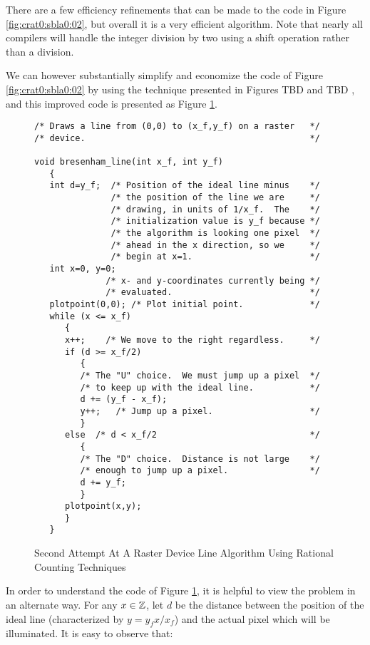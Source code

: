 There are a few efficiency refinements that can be made to 
the code in Figure \ref{fig:crat0:sbla0:02}, but overall
it is a very efficient algorithm.  Note that
nearly all compilers will handle the integer
division by two using a shift
operation rather than a division.

We can however substantially simplify and economize the code of
Figure \ref{fig:crat0:sbla0:02} by using the technique 
presented in Figures TBD
and
TBD
, and this improved code is
presented as Figure \ref{fig:crat0:sbla0:03}.

\begin{figure}
\begin{verbatim}
/* Draws a line from (0,0) to (x_f,y_f) on a raster   */
/* device.                                            */

void bresenham_line(int x_f, int y_f)
   {
   int d=y_f;  /* Position of the ideal line minus    */
               /* the position of the line we are     */
               /* drawing, in units of 1/x_f.  The    */
               /* initialization value is y_f because */
               /* the algorithm is looking one pixel  */
               /* ahead in the x direction, so we     */
               /* begin at x=1.                       */
   int x=0, y=0;
              /* x- and y-coordinates currently being */
              /* evaluated.                           */
   plotpoint(0,0); /* Plot initial point.             */
   while (x <= x_f)
      {
      x++;    /* We move to the right regardless.     */
      if (d >= x_f/2)
         {
         /* The "U" choice.  We must jump up a pixel  */
         /* to keep up with the ideal line.           */
         d += (y_f - x_f);
         y++;   /* Jump up a pixel.                   */
         }
      else  /* d < x_f/2                              */
         {
         /* The "D" choice.  Distance is not large    */
         /* enough to jump up a pixel.                */
         d += y_f;
         }
      plotpoint(x,y);
      }
   }
\end{verbatim}
\caption{Second Attempt At A Raster Device Line Algorithm
         Using Rational Counting Techniques}
\label{fig:crat0:sbla0:03}
\end{figure}

In order to understand the code of Figure \ref{fig:crat0:sbla0:03},
it is helpful to view the problem in an alternate way.  
For any $x \in {\mathbb{Z}}$, let
$d$ be the distance between the position of the ideal line
(characterized by $y = y_f x / x_f$) and
the actual pixel which will be illuminated.  It is easy to
observe that:

